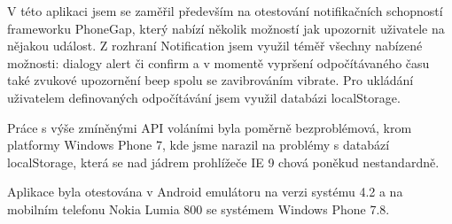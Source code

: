 V této aplikaci jsem se zaměřil především na otestování notifikačních schopností frameworku PhoneGap, který nabízí několik možností jak upozornit uživatele na nějakou událost. Z rozhraní Notification  jsem využil téměř všechny nabízené možnosti: dialogy alert či confirm a v momentě vypršení odpočítávaného času také zvukové upozornění beep spolu se zavibrováním vibrate. Pro ukládání uživatelem definovaných odpočítávání jsem využil databázi localStorage.

Práce s výše zmíněnými API voláními byla poměrně bezproblémová, krom platformy Windows Phone 7, kde jsme narazil na problémy s databází localStorage, která se nad jádrem prohlížeče IE 9 chová poněkud nestandardně.
        
Aplikace byla otestována v Android emulátoru na verzi systému 4.2 a na mobilním telefonu Nokia Lumia 800 se systémem Windows Phone 7.8.